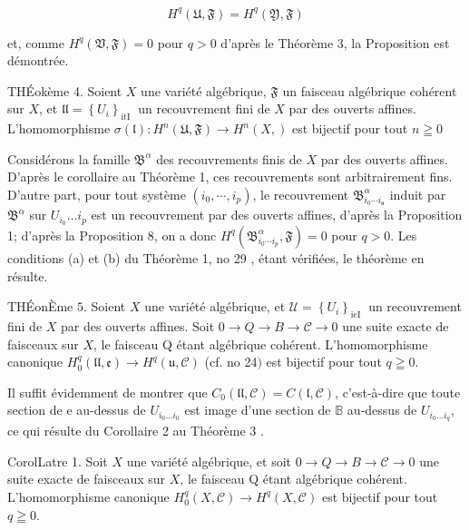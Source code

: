 $$
H^{q}(\mathfrak{U}, \mathfrak{F})=H^{q}(\mathfrak{Y}, \mathfrak{F})
$$

et, comme $H^{q}(\mathfrak{V}, \mathfrak{F})=0$ pour $q>0$ d'après le Théorème 3, la Proposition est démontrée.

THÉokème 4. Soient $X$ une variété algébrique, $\mathfrak{F}$ un faisceau algébrique cohérent sur $X$, et $\mathfrak{l l}=\left\{U_{i}\right\}_{\text {itI }}$ un recouvrement fini de $X$ par des ouverts affines. L'homomorphisme $\sigma(\mathfrak{l}): H^{n}(\mathfrak{U}, \mathfrak{F}) \rightarrow H^{n}(X, \mathfrak{})$ est bijectif pour tout $n \geqq 0$

Considérons la famille $\mathfrak{B}^{\alpha}$ des recouvrements finis de $X$ par des ouverts affines. D'après le corollaire au Théorème 1, ces recouvrements sont arbitrairement fins. D'autre part, pour tout système $\left(i_{0}, \cdots, i_{p}\right)$, le recouvrement $\mathfrak{B}_{i_{0} \cdots i_{\mathfrak{n}}}^{\alpha}$ induit par $\mathfrak{B}^{\alpha}$ sur $U_{i_{0}} \ldots i_{p}$ est un recouvrement par des ouverts affines, d'après la Proposition 1; d'après la Proposition 8, on a donc $H^{q}\left(\mathfrak{B}_{i_{0} \cdots i_{p}}^{\alpha}, \mathfrak{F}\right)=0$ pour $q>0$. Les conditions (a) et (b) du Théorème 1, no 29 , étant vérifiées, le théorème en résulte.

THÉonÈme $5 .$ Soient $X$ une variété algébrique, et $\mathcal{U}=\left\{U_{i}\right\}_{\text {ieI }}$ un recouvrement fini de $X$ par des ouverts affines. Soit $0 \rightarrow Q \rightarrow B \rightarrow \mathcal{C} \rightarrow 0$ une suite exacte de faisceaux sur $X$, le faisceau Q étant algébrique cohérent. L'homomorphisme canonique $H_{0}^{q}(\mathfrak{l l}, \mathfrak{e}) \rightarrow H^{q}(\mathfrak{u}, \mathcal{C})$ (cf. no 24$)$ est bijectif pour tout $q \geqq 0$.

Il suffit évidemment de montrer que $C_{0}(\mathfrak{l l}, \mathcal{C})=C(\mathfrak{l}, \mathcal{C})$, c'est-à-dire que toute section de e au-dessus de $U_{i_{0} \ldots i_{0}}$ est image d'une section de $\mathbb{B}$ au-dessus de $U_{i_{0} \ldots i_{q}}$, ce qui résulte du Corollaire 2 au Théorème 3 .

CorolLatre 1. Soit $X$ une variété algébrique, et soit $0 \rightarrow Q \rightarrow B \rightarrow \mathcal{C} \rightarrow 0$ une suite exacte de faisceaux sur $X$, le faisceau Q étant algébrique cohérent. L'homomorphisme canonique $H_{0}^{q}(X, \mathcal{C}) \rightarrow H^{q}(X, \mathcal{C})$ est bijectif pour tout $q \geqq 0$.

